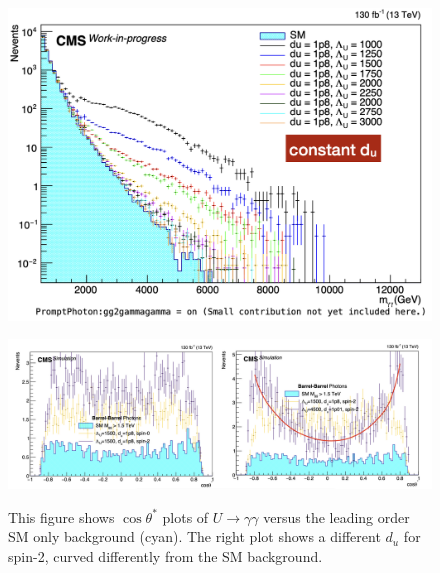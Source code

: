 \begin{figure}[!htbp]
    \includegraphics[scale=0.4]{fig/UnparticlesConstant_du.png}
	\label{fig:UnparHistogSensitivity}
\end{figure}

\begin{figure}[!htbp]
\caption{This figure shows $\cos \theta^*$ plots of $U{\rightarrow}\gamma\gamma$ versus the leading order SM only background (cyan). The right plot shows a different $d_u$ for spin-2, curved differently from the SM background.}
	\centering
    \includegraphics[scale=0.4]{fig/cosThetaStar.png}
	\label{fig:UnparCosThetaStar}
\end{figure}


    
